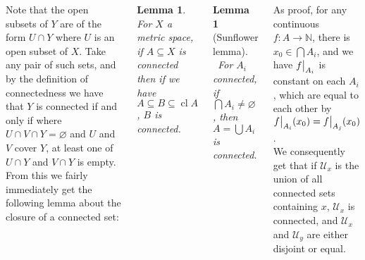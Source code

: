 \documentclass{tikzposter} %
\DeclareMathOperator{\cl}{cl}
\newcommand\restr[2]{{%
  \left.\kern-\nulldelimiterspace %
  #1 %
  \vphantom{\big|} %
  \right|_{#2} %
  }}
\newtheorem{lemma}[theorem]{Lemma}
\newtheorem{definition}{Definition}
\begin{document}
\begin{columns}
{  Note that the open subsets of $Y$ are of the form $U \cap Y$ where $U$ is an open subset of $X$. Take any pair of such sets, and by the definition of connectedness we have that $Y$ is connected if and only if where $U \cap V \cap Y = \varnothing$ and $U$ and $V$ cover $Y$, at least one of $U \cap Y$ and $V \cap Y$ is empty. \\

  From this we fairly immediately get the following lemma about the closure of a connected set:

  \begin{lemma}
    For $X$ a metric space, if $A \subseteq X$ is connected then if we have $A \subseteq B \subseteq \cl A$, $B$ is connected.
  \end{lemma}
  \hphantom{}

  \begin{lemma}[Sunflower lemma]
  \ For $A_{i}$ connected, if $\bigcap A_{i} \neq \varnothing$, then $A = \bigcup A_{i}$ is connected.
  \end{lemma}
  \hphantom{}

  As proof, for any continuous $f : A \to \mathbb{N}$, there is $x_{0} \in \bigcap A_{i}$, and we have $\restr{f}{A_{i}}$ is constant on each $A_{i}$, which are equal to each other by $\restr{f}{A_{i}}(x_{0}) = \restr{f}{A_{j}}(x_{0})$. \\

  We consequently get that if $\mathcal{U}_{x}$ is the union of all connected sets containing $x$, $\mathcal{U}_{x}$ is connected, and $\mathcal{U}_{x}$ and $\mathcal{U}_{y}$ are either disjoint or equal. \\



  }
\end{columns}
\end{document}
